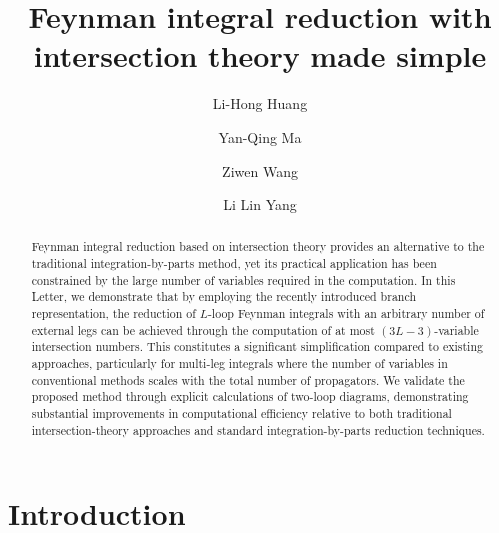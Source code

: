 \documentclass[reprint,superscriptaddress]{revtex4-2}
\begin{document}
\title{Feynman integral reduction with intersection theory made simple}


\author{Li-Hong Huang}

\author{Yan-Qing Ma}

\author{Ziwen Wang}

\author{Li Lin Yang}

\begin{abstract}
Feynman integral reduction based on intersection theory provides an alternative to the traditional integration-by-parts method, yet its practical application has been constrained by the large number of variables required in the computation. In this Letter, we demonstrate that by employing the recently introduced branch representation, the reduction of $L$-loop Feynman integrals with an arbitrary number of external legs can be achieved through the computation of at most $(3L-3)$-variable intersection numbers. This constitutes a significant simplification compared to existing approaches, particularly for multi-leg integrals where the number of variables in conventional methods scales with the total number of propagators. We validate the proposed method through explicit calculations of two-loop diagrams, demonstrating substantial improvements in computational efficiency relative to both traditional intersection-theory approaches and standard integration-by-parts reduction techniques.
\end{abstract}

\maketitle

\section{Introduction}
\end{document}
